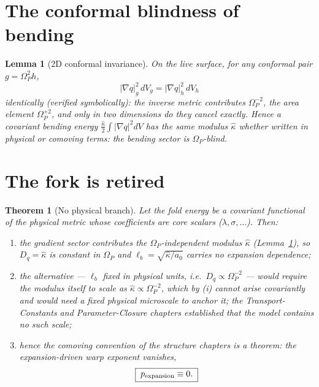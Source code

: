 \documentclass[11pt,a4paper,oneside]{book}
\newcommand{\Op}{\Omega_P}
\newcommand{\Dq}{D_q}
\newcommand{\lb}{\ell_b}
\newcommand{\kw}{\hat\kappa}
\theoremstyle{plain}
\newtheorem{lemma}{Lemma}[chapter]
\newtheorem{theorem}{Theorem}[chapter]
\theoremstyle{definition}
\theoremstyle{remark}
\begin{document}
\section{The conformal blindness of bending}

\begin{lemma}[2D conformal invariance]\label{warpexponent:lem:conf}
On the live surface, for any conformal pair $g=\Op^2h$,
\begin{equation}
\boxed{\;|\nabla q|_g^2\,dV_g=|\nabla q|_h^2\,dV_h\;}
\end{equation}
identically (verified symbolically): the inverse metric contributes $\Op^{-2}$, the area element
$\Op^{+2}$, and only in two dimensions do they cancel exactly. Hence a covariant bending energy
$\tfrac{\kw}{2}\int|\nabla q|^2dV$ has \emph{the same} modulus $\kw$ whether written in physical or
comoving terms: the bending sector is $\Op$-blind.
\end{lemma}

\section{The fork is retired}

\begin{theorem}[No physical branch]\label{warpexponent:thm:fork}
Let the fold energy be a covariant functional of the physical metric whose coefficients are core
scalars ($\lambda,\sigma,\dots$). Then:
\begin{enumerate}[label=(\roman*),leftmargin=1.8em,itemsep=2pt]
\item the gradient sector contributes the $\Op$-independent modulus $\kw$
(Lemma~\ref{warpexponent:lem:conf}), so $\Dq=\kw$ is \emph{constant in} $\Op$ and
$\lb=\sqrt{\kw/a_0}$ carries no expansion dependence;
\item the alternative --- $\lb$ fixed in physical units, i.e.\ $\Dq\propto\Op^{-2}$ --- would require
the modulus itself to scale as $\kw\propto\Op^{-2}$, which by (i) cannot arise covariantly and would
need a fixed \emph{physical} microscale to anchor it; the Transport-Constants and Parameter-Closure
chapters established that the model contains no such scale;
\item hence the comoving convention of the structure chapters is a \emph{theorem}: the
expansion-driven warp exponent vanishes,
\begin{equation}
\boxed{\;p_{\rm expansion}\equiv0.\;}
\end{equation}
\end{enumerate}
\end{theorem}
\end{document}
